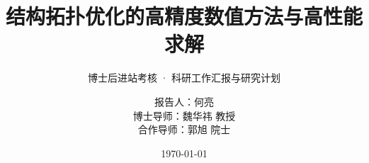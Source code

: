 \documentclass[notheorems]{beamer}
\begin{document}
	\title[科研汇报]{结构拓扑优化的高精度数值方法与高性能求解}
	\subtitle{博士后进站考核 · 科研工作汇报与研究计划}

	\author[何亮]{报告人：何亮 \\
		\vspace{5pt}
		博士导师：{魏华祎} 教授 \\
		\vspace{2pt}
		合作导师：{郭旭} 院士}

	\date{\today}

	\frame[plain]{\titlepage}
\end{document}
